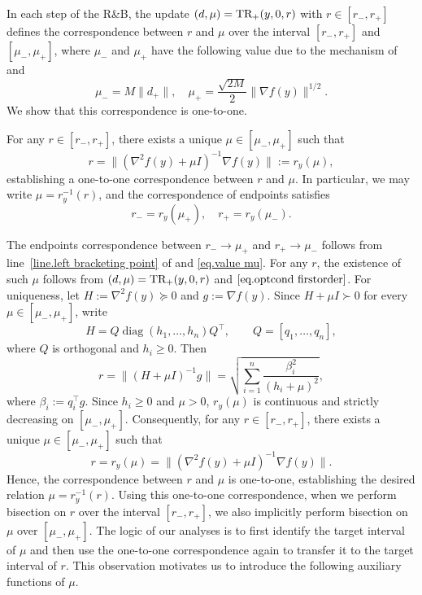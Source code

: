 \documentclass[moor,sglanonrev]{informs4}
\begin{document}
In each step of the R\&B, the update $(d,\mu)=\textrm{TR}_+(y,0,r)$ with $r\in[r_-,r_+]$ defines the correspondence between $r$ and $\mu$ over the interval $[r_-,r_+]$ and $[\mu_-,\mu_+]$, where $\mu_-$ and $\mu_+$ have the following value due to the mechanism of  and 
\begin{equation}\label{eq.value mu}
    \mu_- = M\|d_+\|, \quad \mu_+=\frac{\sqrt{2M}}{2}\|\nabla f(y)\|^{1/2}.
\end{equation}
We show that this correspondence is one-to-one.

\begin{lemma}
    \label{lem.one-to-one correspondence}
    For any $r \in [r_-, r_+]$, there exists a unique $\mu \in [\mu_-, \mu_+]$ such that
    \[
        r = \|(\nabla^2 f(y) + \mu I)^{-1} \nabla f(y)\| := r_y(\mu),
    \]
    establishing a one-to-one correspondence between $r$ and $\mu$.
    In particular, we may write $\mu = r_y^{-1}(r)$,
    and the correspondence of endpoints satisfies
    \[
        r_- = r_y(\mu_+),
        \quad
        r_+ = r_y(\mu_-).
    \]
\end{lemma}
The endpoints correspondence between $r_- \to \mu_+$ and $r_+ \to \mu_-$ follows from line~\ref{line.left bracketing point} of  and \eqref{eq.value mu}.
For any $r$, the existence of such $\mu$ follows from $(d,\mu)=\textrm{TR}_+(y,0,r)$ and $\eqref{eq.optcond firstorder}$. For uniqueness, let $H:=\nabla^2 f(y)\succeq0$ and $g:=\nabla f(y)$. Since $H+\mu I\succ0$ for every $\mu\in[\mu_-,\mu_+]$, write
\[
    H=Q\operatorname{diag}(h_1,\ldots,h_n)Q^\top,
    \qquad Q=[q_1,\ldots,q_n],
\]
where $Q$ is orthogonal and $h_i\geq0$.
Then
\[
    r = \bigl\|(H + \mu I)^{-1}g\bigr\|
    = \sqrt{\sum_{i=1}^n \frac{\beta_i^2}{(h_i + \mu)^2}},
\]
where $\beta_i:=q_i^\top g$. Since $h_i\geq0$ and $\mu>0$, $r_y(\mu)$ is continuous and strictly decreasing on $[\mu_-,\mu_+]$.
Consequently, for any $r \in [r_-, r_+]$, there exists a unique $\mu \in [\mu_-, \mu_+]$ such that
\[
    r = r_y(\mu) = \bigl\|(\nabla^2 f(y) + \mu I)^{-1}\nabla f(y)\bigr\|.
\]
Hence, the correspondence between $r$ and $\mu$ is one-to-one, establishing the desired relation $\mu = r_y^{-1}(r)$.
\Halmos \endproof
Using this one-to-one correspondence, when we perform bisection on $r$ over the interval $[r_-,r_+]$, we also implicitly perform bisection on $\mu$ over $[\mu_-,\mu_+]$. The logic of our analyses is to first identify the target interval of $\mu$ and then use the one-to-one correspondence again to transfer it to the target interval of $r$. This observation motivates us to introduce the following auxiliary functions of $\mu$.
\end{document}
